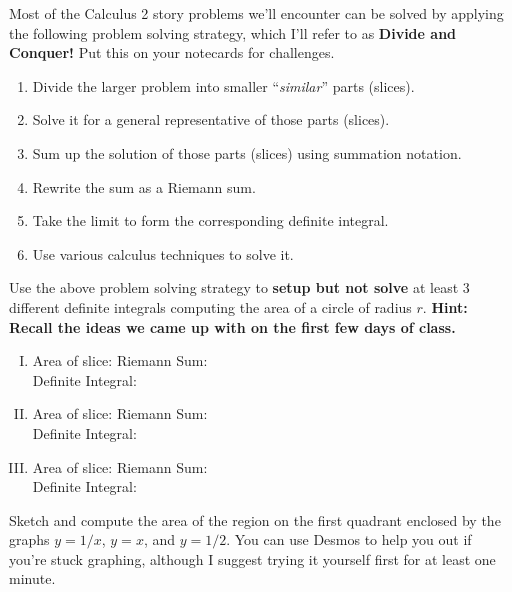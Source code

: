 \documentclass[answers]{exam}
\begin{document}
\begin{questions}
	
\question Most of the Calculus 2 story problems we'll encounter can be solved by applying the following problem solving strategy, which I'll refer to as \textbf{Divide and Conquer!} Put this on your notecards for challenges.

\begin{enumerate}[Step 1.]
	\item Divide the larger problem into smaller ``\emph{similar}'' parts (slices).
	\item Solve it for a general representative of those parts (slices).
	\item Sum up the solution of those parts (slices) using summation notation.
	\item Rewrite the sum as a Riemann sum.
	\item Take the limit to form the corresponding definite integral.
	\item Use various calculus techniques to solve it. 
\end{enumerate}

Use the above problem solving strategy to \textbf{setup but not solve} at least 3 different definite integrals computing the area of a circle of radius $r$. \textbf{Hint: Recall the ideas we came up with on the first few days of class.}\\

\begin{enumerate}[I.]
	\item Area of slice: \hspace{2in} Riemann Sum:\\
	
	Definite Integral: \\
	
	\item Area of slice: \hspace{2in} Riemann Sum:\\
	
	Definite Integral: \\
	
	\item Area of slice: \hspace{2in} Riemann Sum:\\
	
	Definite Integral: \\
\end{enumerate}

\question Sketch and compute the area of the region on the first quadrant enclosed by the graphs $y = 1/x$, $y = x$, and $y = 1/2$. You can use Desmos to help you out if you're stuck graphing, although I suggest trying it yourself first for at least one minute.\\



\end{questions}
\end{document}
